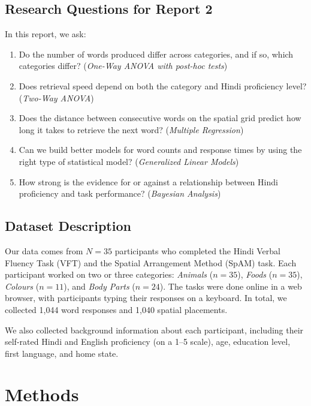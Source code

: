 \documentclass[12pt, a4paper]{article}
\begin{document}
\subsection{Research Questions for Report 2}

In this report, we ask:
\begin{enumerate}[nosep]
    \item[\textbf{RQ1:}] Do the number of words produced differ across categories, and if so, which categories differ? (\textit{One-Way ANOVA with post-hoc tests})
    \item[\textbf{RQ2:}] Does retrieval speed depend on both the category and Hindi proficiency level? (\textit{Two-Way ANOVA})
    \item[\textbf{RQ3:}] Does the distance between consecutive words on the spatial grid predict how long it takes to retrieve the next word? (\textit{Multiple Regression})
    \item[\textbf{RQ4:}] Can we build better models for word counts and response times by using the right type of statistical model? (\textit{Generalized Linear Models})
    \item[\textbf{RQ5:}] How strong is the evidence for or against a relationship between Hindi proficiency and task performance? (\textit{Bayesian Analysis})
\end{enumerate}

\subsection{Dataset Description}

Our data comes from $N = 35$ participants who completed the Hindi Verbal Fluency Task (VFT) and the Spatial Arrangement Method (SpAM) task. Each participant worked on two or three categories: \textit{Animals} ($n = 35$), \textit{Foods} ($n = 35$), \textit{Colours} ($n = 11$), and \textit{Body Parts} ($n = 24$). The tasks were done online in a web browser, with participants typing their responses on a keyboard. In total, we collected 1,044 word responses and 1,040 spatial placements.

We also collected background information about each participant, including their self-rated Hindi and English proficiency (on a 1--5 scale), age, education level, first language, and home state.

\section{Methods}
\end{document}
